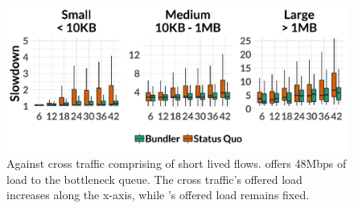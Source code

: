 \begin{figure}
    \centering
\begin{knitrout}
\color{fgcolor}
\includegraphics[width=\maxwidth]{figure/robust_cr-inelastic-1} 

\end{knitrout}
    \caption{Against cross traffic comprising of short lived flows. \name offers 48Mbps of load to the bottleneck queue. The cross traffic's offered load increases along the x-axis, while \name{}'s offered load remains fixed.}
    \label{fig:robust:cr-inelastic}
\end{figure}
